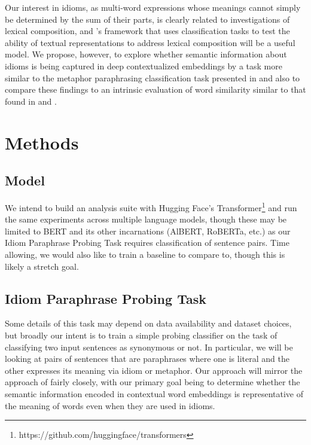 \documentclass[11pt,a4paper]{article}
\begin{document}
Our interest in idioms, as multi-word expressions whose meanings cannot simply be determined by the sum of their parts, is clearly related to investigations of lexical composition, and \citet{shwartz2019pain}'s framework that uses classification tasks to test the ability of textual representations to address lexical composition will be a useful model. We propose, however, to explore whether semantic information about idioms is being captured in deep contextualized embeddings by a task more similar to the metaphor paraphrasing classification task presented in \citet{bizzoni-lappin-2018-predicting} and also to compare these findings to an intrinsic evaluation of word similarity similar to that found in \citet{Wang_2019} and \citet{van_Aken_2019}.




\section{Methods}

\subsection{Model}
We intend to build an analysis suite with Hugging Face's Transformer\footnote{https://github.com/huggingface/transformers} and run the same experiments across multiple language models, though these may be limited to BERT and its other incarnations (AlBERT, RoBERTa, etc.) as our Idiom Paraphrase Probing Task requires classification of sentence pairs. Time allowing, we would also like to train a baseline to compare to, though this is likely a stretch goal.

\subsection{Idiom Paraphrase Probing Task}

Some details of this task may depend on data availability and dataset choices, but broadly our intent is to train a simple probing classifier on the task of classifying two input sentences as synonymous or not. In particular, we will be looking at pairs of sentences that are paraphrases where one is literal and the other expresses its meaning via idiom or metaphor. Our approach will mirror the approach of \cite{bizzoni-lappin-2018-predicting} fairly closely, with our primary goal being to determine whether the semantic information encoded in contextual word embeddings is representative of the meaning of words even when they are used in idioms. 
\end{document}
